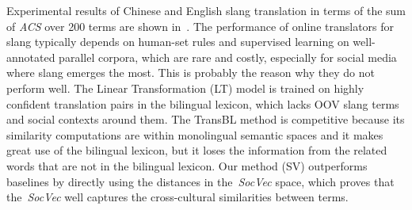 Experimental results of Chinese and English slang translation in terms of the sum of \textit{ACS} over 200 terms are shown in~.
The performance of online translators for slang typically depends on human-set rules and supervised learning on well-annotated parallel corpora, which are rare and costly, especially for social media where slang emerges the most. 
This is probably the reason why they do not perform well. 
The Linear Transformation (LT) model is trained on highly confident translation pairs 
in the bilingual lexicon, which lacks OOV slang terms and social contexts around them. 
The {TransBL} method is competitive because its similarity computations 
are within monolingual semantic spaces and it makes great use of the bilingual lexicon, but it loses the information from the related words 
that are not in the bilingual lexicon.
Our method (SV) outperforms baselines by directly using the distances in 
the~\textit{SocVec} space, which proves 
that the~\textit{SocVec} well captures the cross-cultural similarities between terms.

